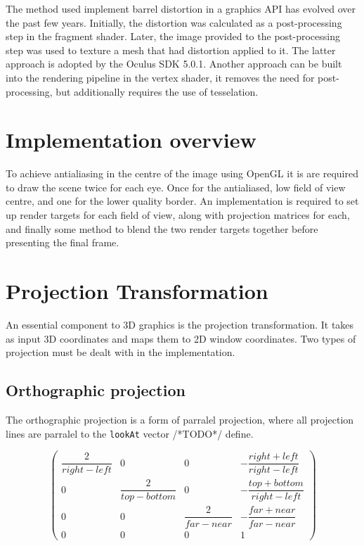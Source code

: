 \documentclass[12pt,a4paper,twoside,openright]{report}
\begin{document}
The method used implement barrel distortion in a graphics API has evolved over the past few years. Initially, the distortion was calculated as a post-processing step in the fragment shader. Later, the image provided to the post-processing step was used to texture a mesh that had distortion applied to it. The latter approach is adopted by the Oculus SDK 5.0.1. Another approach can be built into the rendering pipeline in the vertex shader, it removes the need for post-processing, but additionally requires the use of tesselation.

\section{Implementation overview} 

To achieve antialiasing in the centre of the image using OpenGL it is are required to draw the scene twice for each eye. Once for the antialiased, low field of view centre, and one for the lower quality border. An implementation is required to set up render targets for each field of view, along with projection matrices for each, and finally some method to blend the two render targets together before presenting the final frame.

\section{Projection Transformation}

An essential component to 3D graphics is the projection transformation. It takes as input 3D coordinates and maps them to 2D window coordinates.
Two types of projection must be dealt with in the implementation. 

\subsection{Orthographic projection}
The orthographic projection is a form of parralel projection, where all projection lines are parralel to the \texttt{lookAt} vector /*TODO*/ define. 

\[
\begin{pmatrix}
\dfrac{2}{right-left} & 0 & 0 & -\dfrac{right+left}{right-left} \\
0 & \dfrac{2}{top-bottom} & 0 & -\dfrac{top+bottom}{right-left} \\
0 & 0 & \dfrac{2}{far-near} & -\dfrac{far + near}{far-near} \\
0 & 0 & 0 & 1
\end{pmatrix}
\]
\end{document}
